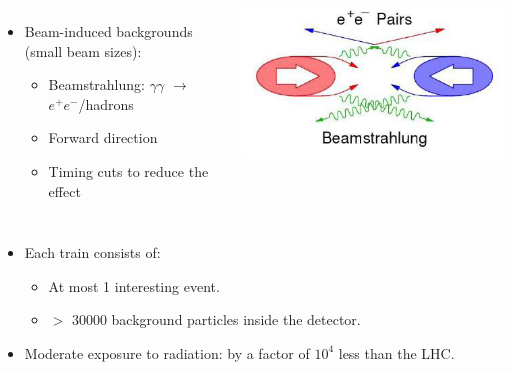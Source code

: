 \begin{frame}





  \begin{columns}
    \begin{itemize}
    \item Beam-induced backgrounds (small beam sizes):
      \begin{itemize}
      \item Beamstrahlung: $\gamma\gamma$ $\rightarrow$
        $e^{+}e^{-}$/hadrons
      \item Forward direction
      \item Timing cuts to reduce the effect
      \end{itemize}
    \end{itemize}
    
    \centering
    \includegraphics[width=\textwidth]{figures/beamstrahlung.png}
  \end{columns}

  \begin{itemize}
  \item Each train consists of:
    \begin{itemize}
    \item At most 1 interesting event.
    \item $>$ 30000 background particles inside the detector.
    \end{itemize}
  \item Moderate exposure to radiation: by a factor of $10^4$ less
    than the LHC.
  \end{itemize}
\end{frame}


